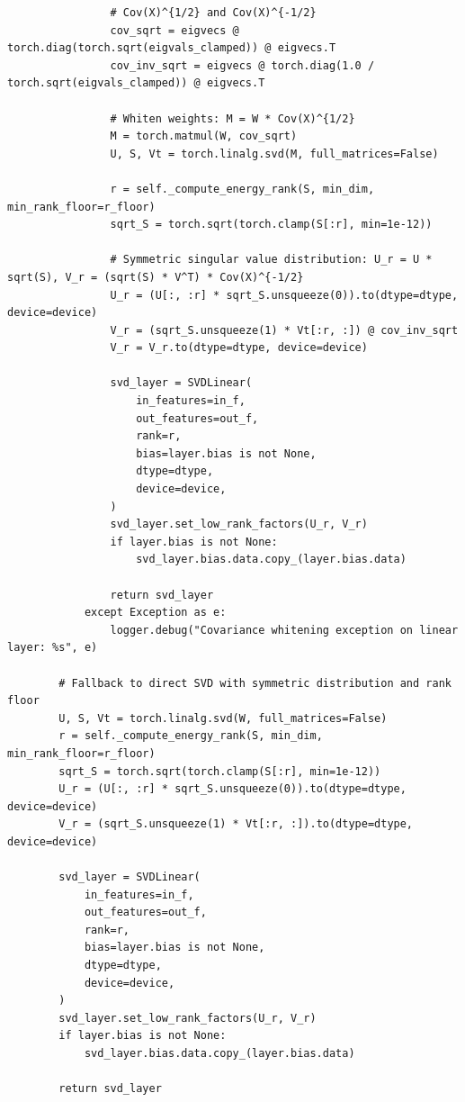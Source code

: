 \begin{lstlisting}
                # Cov(X)^{1/2} and Cov(X)^{-1/2}
                cov_sqrt = eigvecs @ torch.diag(torch.sqrt(eigvals_clamped)) @ eigvecs.T
                cov_inv_sqrt = eigvecs @ torch.diag(1.0 / torch.sqrt(eigvals_clamped)) @ eigvecs.T

                # Whiten weights: M = W * Cov(X)^{1/2}
                M = torch.matmul(W, cov_sqrt)
                U, S, Vt = torch.linalg.svd(M, full_matrices=False)

                r = self._compute_energy_rank(S, min_dim, min_rank_floor=r_floor)
                sqrt_S = torch.sqrt(torch.clamp(S[:r], min=1e-12))

                # Symmetric singular value distribution: U_r = U * sqrt(S), V_r = (sqrt(S) * V^T) * Cov(X)^{-1/2}
                U_r = (U[:, :r] * sqrt_S.unsqueeze(0)).to(dtype=dtype, device=device)
                V_r = (sqrt_S.unsqueeze(1) * Vt[:r, :]) @ cov_inv_sqrt
                V_r = V_r.to(dtype=dtype, device=device)

                svd_layer = SVDLinear(
                    in_features=in_f,
                    out_features=out_f,
                    rank=r,
                    bias=layer.bias is not None,
                    dtype=dtype,
                    device=device,
                )
                svd_layer.set_low_rank_factors(U_r, V_r)
                if layer.bias is not None:
                    svd_layer.bias.data.copy_(layer.bias.data)

                return svd_layer
            except Exception as e:
                logger.debug("Covariance whitening exception on linear layer: %s", e)

        # Fallback to direct SVD with symmetric distribution and rank floor
        U, S, Vt = torch.linalg.svd(W, full_matrices=False)
        r = self._compute_energy_rank(S, min_dim, min_rank_floor=r_floor)
        sqrt_S = torch.sqrt(torch.clamp(S[:r], min=1e-12))
        U_r = (U[:, :r] * sqrt_S.unsqueeze(0)).to(dtype=dtype, device=device)
        V_r = (sqrt_S.unsqueeze(1) * Vt[:r, :]).to(dtype=dtype, device=device)

        svd_layer = SVDLinear(
            in_features=in_f,
            out_features=out_f,
            rank=r,
            bias=layer.bias is not None,
            dtype=dtype,
            device=device,
        )
        svd_layer.set_low_rank_factors(U_r, V_r)
        if layer.bias is not None:
            svd_layer.bias.data.copy_(layer.bias.data)

        return svd_layer


\end{lstlisting}

